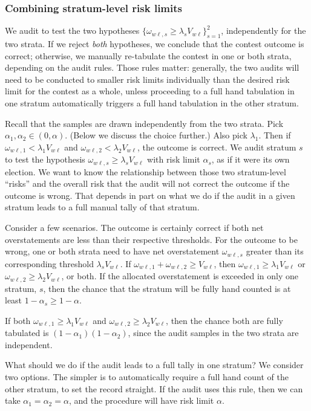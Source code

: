 \subsubsection{Combining stratum-level risk limits}\label{sec:stratumRisk}
We audit to test the two hypotheses $\{\omega_{w\ell,s} \ge \lambda_s V_{w\ell}\}_{s=1}^2$, 
independently for the two strata.
If we reject \emph{both} hypotheses, we conclude that the contest outcome is correct;
otherwise, we manually re-tabulate the contest in one or both strata, depending on the
audit rules.
Those rules matter:
generally, the two audits will need to be conducted to smaller risk limits individually than the desired
risk limit for the contest as a whole, unless proceeding to a full hand tabulation in one stratum
automatically triggers a full hand tabulation in the other stratum.

Recall that the samples are drawn independently from the two strata.
Pick $\alpha_1, \alpha_2 \in (0,\alpha)$.
(Below we discuss the choice further.)
Also pick $\lambda_1$.
Then if $\omega_{w\ell,1} < \lambda_1 V_{w\ell}$ and 
$\omega_{w\ell,2} < \lambda_2 V_{w\ell}$,
the outcome is correct.
We audit stratum $s$ to test the hypothesis $\omega_{w\ell,s} \ge \lambda_s V_{w\ell}$ 
with risk limit $\alpha_s$,
as if it were its own election.
We want to know the relationship between those two stratum-level ``risks'' and the 
overall risk that the audit will not correct the outcome if the outcome is wrong.
That depends in part on what we do if the audit in a given stratum leads to a full manual
tally of that stratum.

Consider a few scenarios.
The outcome is certainly correct if both net overstatements are less than their 
respective thresholds. 
For the outcome to be wrong, one or both strata need to have net overstatement
$\omega_{w\ell,s}$
greater than its corresponding threshold $\lambda_s V_{w\ell}$.
If $\omega_{w\ell,1} + \omega_{w\ell,2} \ge V_{w\ell}$, then $\omega_{w\ell,1}\ge \lambda_1V_{w\ell}$
or $\omega_{w\ell,2}\ge \lambda_2V_{w\ell}$, or both.
If the allocated overstatement is exceeded in only one stratum, $s$, then the chance that the 
stratum will be fully hand counted is at least $1-\alpha_s \ge 1- \alpha$.

If both $\omega_{w\ell,1} \ge \lambda_1V_{w\ell}$
and $\omega_{w\ell,2} \ge \lambda_2V_{w\ell}$, then the chance both are fully tabulated is
$(1-\alpha_1)(1-\alpha_2)$, since the audit samples in the two strata are independent.

What should we do if the audit leads to a full tally in one stratum?
We consider two options.
The simpler is to automatically require a full hand count of the other stratum, 
to set the record straight.
If the audit uses this rule, then we can take $\alpha_1 = \alpha_2 = \alpha$, and the procedure will have
risk limit $\alpha$.

